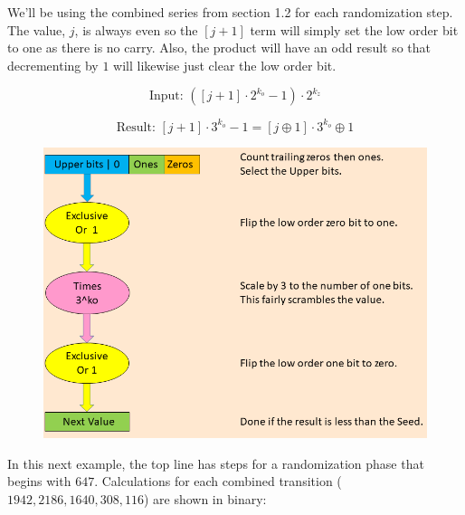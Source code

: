 \documentclass[letterpaper]{article}
\begin{document}
\begin{multicols}{2}
    We'll be using the combined series from section 1.2 for each randomization step. The value, $j$, is always even so the $[j + 1]$ term will simply set the low order bit to one as there is no carry. Also, the product will have an odd result so that decrementing by $1$ will likewise just clear the low order bit.

    \[
        \text{Input: } ([j + 1] \cdot 2^{k_o} - 1) \cdot 2^{k_z}
    \]

    \[
        \text{Result: } [j + 1] \cdot 3^{k_o} - 1 = [j \oplus 1] \cdot 3^{k_o} \oplus 1
    \]



    \begin{figure}
        \includegraphics[width=\textwidth]{collatz_even}
        \caption{}
    \end{figure}

    In this next example, the top line has steps for a randomization phase that begins with $647$. Calculations for each combined transition ($1942, 2186, 1640, 308, 116$) are shown in binary:


\end{multicols}
\end{document}
